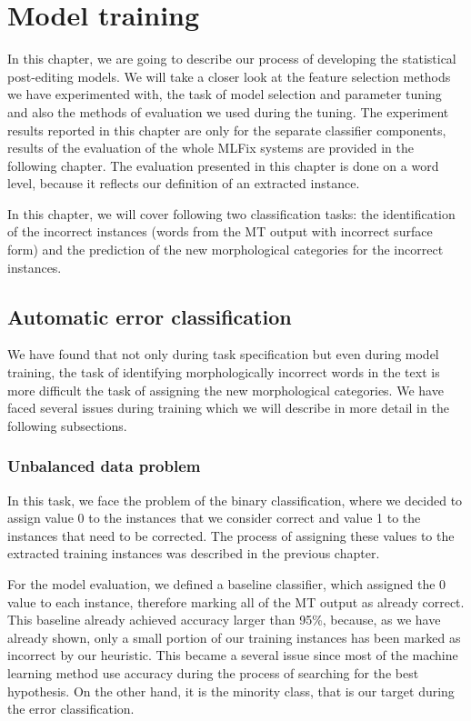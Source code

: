 \chapter{Model training}
\label{chap:tuning}

In this chapter, we are going to describe our process of developing
the statistical post-editing models. We will take a closer look at the feature selection
methods we have experimented with, the task of model selection and parameter
tuning and also the methods of evaluation we used during the tuning.
The experiment results reported in this chapter are only for the separate
classifier components, results of the evaluation of the whole MLFix systems
are provided in the following chapter. The evaluation presented in this chapter
is done on a word level, because it reflects our definition of an extracted instance.

In this chapter, we will cover following two classification tasks: the identification
of the incorrect instances (words from the MT output with incorrect surface form)
and the prediction of the new morphological categories for the incorrect instances.

\section{Automatic error classification}


We have found that not only during task specification but even during model training,
the task of identifying morphologically incorrect words in the text is more difficult
the task of assigning the new morphological categories. We have faced several issues
during training which we will describe in more detail in the following subsections.

\subsection{Unbalanced data problem}

In this task, we face the problem of the binary classification, where we decided
to assign value 0 to the instances that we consider correct and value 1 to the
instances that need to be corrected. The process of assigning these values to the
extracted training instances was described in the previous chapter. 

For the model evaluation, we defined a baseline classifier, which assigned the 0 value
to each instance, therefore marking all of the MT output as already correct.
This baseline already achieved accuracy larger than 95\%, because, as we have already shown,
only a small portion of our
training instances has been marked as incorrect by our heuristic.
This became a several issue since most of the machine learning method use accuracy during
the process of searching for the best hypothesis. On the other hand, it is the minority
class, that is our target during the error classification.

